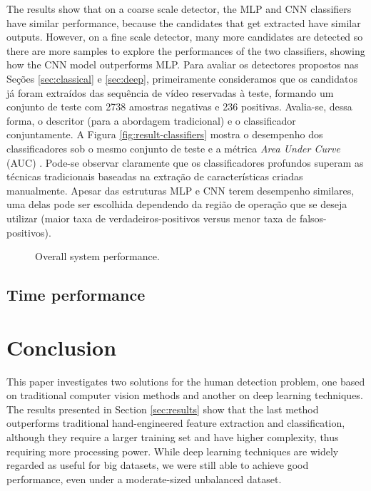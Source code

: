     The results show that on a coarse scale detector, the MLP and CNN classifiers have similar performance, because the candidates that get extracted have similar outputs. However, on a fine scale detector, many more candidates are detected so there are more samples to explore the performances of the two classifiers, showing how the CNN model outperforms MLP.
    Para avaliar os detectores propostos nas Seções \ref{sec:classical} e \ref{sec:deep}, primeiramente consideramos que os candidatos já foram extraídos das sequência de vídeo reservadas à teste, formando um conjunto de teste com 2738 amostras negativas e 236 positivas. Avalia-se, dessa forma, o descritor (para a abordagem tradicional) e o classificador conjuntamente. A Figura \ref{fig:result-classifiers} mostra o desempenho dos classificadores sob o mesmo conjunto de teste e a métrica \textit{Area Under Curve} (AUC) \cite{evaluationMetrics}. Pode-se observar claramente que os classificadores profundos superam as técnicas tradicionais baseadas na extração de características criadas manualmente. Apesar das estruturas MLP e CNN terem desempenho similares, uma delas pode ser escolhida dependendo da região de operação que se deseja utilizar (maior taxa de verdadeiros-positivos versus menor taxa de falsos-positivos).
    \begin{figure*}[!t]
    \vspace{-3ex}
    \centering
    \label{fig:result-system-all-zoom}
    \label{fig:result-system}
    \hfil
    \caption{Overall system performance.}
    \end{figure*}

    \subsection{Time performance}

\section{Conclusion}
\label{sec:conclusion}
    This paper investigates two solutions for the human detection problem, one based on traditional computer vision methods and another on deep learning techniques. The results presented in Section \ref{sec:results} show that the last method outperforms traditional hand-engineered feature extraction and classification, although they require a larger training set and have higher complexity, thus requiring more processing power. While deep learning techniques are widely regarded as useful for big datasets, we were still able to achieve good performance, even under a moderate-sized unbalanced dataset.

